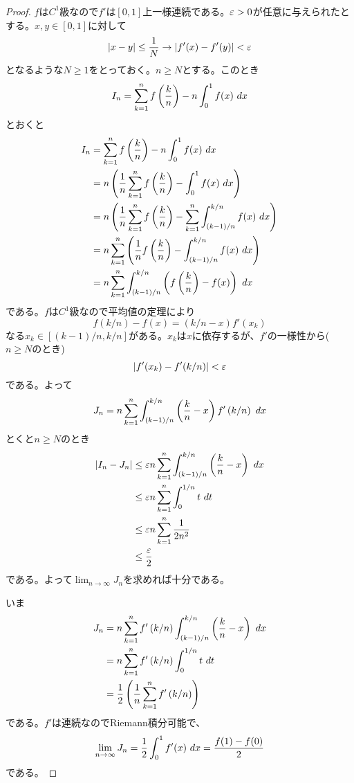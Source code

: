 \subsubsection{}%
\begin{proof}
  $f$は$C^1$級なので$f'$は$[0,1]$上一様連続である。${\varepsilon} > 0$が任意に与えられたとする。$x,y \in [0,1]$に対して
  \[
  \left \lvert x -y  \right \rvert \leq \frac{1}{N} \to \left \lvert f'(x) - f'(y) \right \rvert < {\varepsilon}
  \]
  となるような$N \geq 1$をとっておく。$n \geq N$とする。このとき
  \[
  I_n = \sum_{k=1}^n f\left( \frac{k}{n} \right) - n \int_0^1 f(x) \ dx
  \]
  とおくと
  \begin{align*}
    I_n &= \sum_{k=1}^n f\left( \f{k}{n} \right) - n \int_0^1 f(x) \ dx \\
    &= n \left( \f{1}{n} \sum_{k=1}^n f\left( \f{k}{n} \right) -  \int_0^1 f(x) \ dx \right) \\
    &= n \left( \f{1}{n} \sum_{k=1}^n f\left( \f{k}{n} \right) -  \sum_{k=1}^n \int_{(k-1)/n}^{k/n} f(x) \ dx \right) \\
    &= n \sum_{k=1}^n \left( \f{1}{n}  f\left( \f{k}{n} \right) -   \int_{(k-1)/n}^{k/n} f(x) \ dx \right) \\
    &= n \sum_{k=1}^n \int_{(k-1)/n}^{k/n} \left(   f\left( \f{k}{n} \right) -    f(x)  \right) \ dx
  \end{align*}
  である。$f$は$C^1$級なので平均値の定理により
  \[
  f(k/n) - f(x) = (k/n - x) f'(x_k)
  \]
  なる$x_k \in [(k-1)/n, k/n]$がある。$x_k$は$x$に依存するが、$f'$の一様性から($n \geq N$のとき)
  \[
  \left \lvert f'(x_k) - f'(k/n) \right \rvert < {\varepsilon}
  \]
  である。よって
  \[
  J_n =  n \sum_{k=1}^n \int_{(k-1)/n}^{k/n} \left( \f{k}{n} - x \right)  f'\left( k/n \right) \ dx
  \]
  とくと$n \geq N$のとき
  \begin{align*}
    \left \lvert I_n - J_n \right \rvert &\leq {\varepsilon} n  \sum_{k=1}^n \int_{(k-1)/n}^{k/n} \left( \frac{k}{n} - x \right)   \ dx \\
    &\leq {\varepsilon} n  \sum_{k=1}^n \int_{0}^{1/n} t \ dt \\
    &\leq {\varepsilon} n \sum_{k=1}^n \frac{1}{2n^2} \\
    &\leq \frac{{\varepsilon}}{2}
   \end{align*}
   である。よって$\lim_{n \to \infty} J_n$を求めれば十分である。

   いま
   \begin{align*}
     J_n &= n \sum_{k=1}^n f'\left( k/n \right)  \int_{(k-1)/n}^{k/n} \left( \frac{k}{n} - x \right)   \ dx \\
     &= n \sum_{k=1}^n f'\left( k/n \right)  \int_{0}^{1/n} t \ dt \\
     &= \frac{1}{2} \left( \frac{1}{n} \sum_{k=1}^n  f'\left( k/n \right) \right)
   \end{align*}
   である。$f'$は連続なのでRiemann積分可能で、
   \[
   \lim_{n \to \infty} J_n = \frac{1}{2} \int_0^1 f'(x) \ dx = \frac{f(1) - f(0)}{2}
   \]
   である。
\end{proof}
